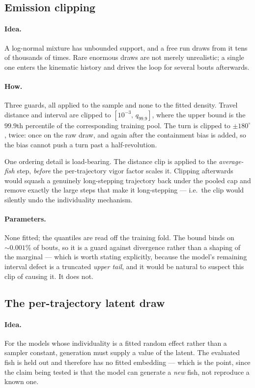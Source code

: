 \subsection{Emission clipping}

\paragraph{Idea.} A log-normal mixture has unbounded support, and a free run draws from it tens of
thousands of times. Rare enormous draws are not merely unrealistic; a single one enters the
kinematic history and drives the loop for several bouts afterwards.

\paragraph{How.} Three guards, all applied to the sample and none to the fitted density.
Travel distance and interval are clipped to $[10^{-3},\,q_{99.9}]$, where the upper bound is the
$99.9$th percentile of the corresponding training pool. The turn is clipped to $\pm180^\circ$,
twice: once on the raw draw, and again after the containment bias is added, so the bias cannot
push a turn past a half-revolution.

One ordering detail is load-bearing. The distance clip is applied to the \emph{average-fish} step,
\emph{before} the per-trajectory vigor factor scales it. Clipping afterwards would squash a
genuinely long-stepping trajectory back under the pooled cap and remove exactly the large steps that
make it long-stepping --- i.e.\ the clip would silently undo the individuality mechanism.

\paragraph{Parameters.} None fitted; the quantiles are read off the training fold. The bound binds
on ${\sim}0.001\%$ of bouts, so it is a guard against divergence rather than a shaping of the
marginal --- which is worth stating explicitly, because the model's remaining interval defect is a
truncated \emph{upper tail}, and it would be natural to suspect this clip of causing it. It does
not.


\subsection{The per-trajectory latent draw}

\paragraph{Idea.} For the models whose individuality is a fitted random effect rather than a
sampler constant, generation must supply a value of the latent. The evaluated fish is held out and
therefore has no fitted embedding --- which is the point, since the claim being tested is that the
model can generate a \emph{new} fish, not reproduce a known one.

